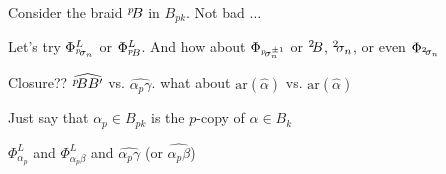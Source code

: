 \documentclass{amsart}
\newcommand{\pp}[2][-2]{\ensuremath ^{#2}\hspace*{#1 pt}}
\begin{document}
 Consider the braid $\pp p B$ in $B_{pk}$. Not bad $\ldots$

Let's try $\Phi_{\pp [-1.5]p \sigma_n}^L$ or $\Phi_{\pp [-1.5]p B}^L$. And how about $\Phi_{\pp[-1.5]p \sigma_n^{\pm1}}$ or $\pp 2 B$, $\pp 2 \sigma_n$, or even $\Phi_{\pp[-1.5]2 \sigma_n}$

Closure?? $\widehat{\pp pB B'}$ vs. $\widehat{\alpha_p\gamma}$. what about $\text{ar}(\widehat{\alpha})$ vs. $\text{ar}(\hat{\alpha})$

Just say that $\alpha_p\in B_{pk}$ is the $p$-copy of $\alpha\in B_k$

$\Phi_{\alpha_p}^L$ and $\Phi_{\alpha_p\beta}^L$ and $\widehat{\alpha_p\gamma}$ (or $\hat{\alpha_p\beta}$)
\end{document}
